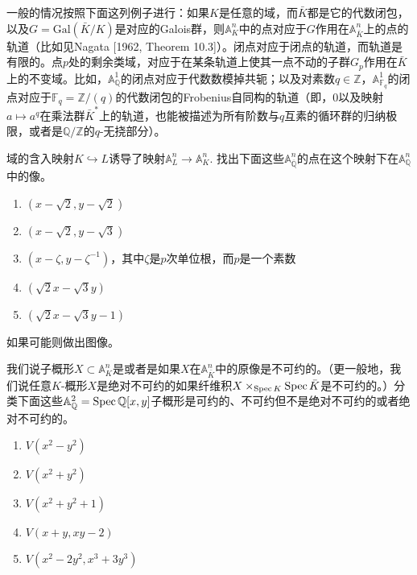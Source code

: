 一般的情况按照下面这列例子进行：如果$K$是任意的域，而$\bar K$都是它的代数闭包，以及$G=\mathrm{Gal}(\bar K/K)$是对应的Galois群，则$\mathbb{A}_{K}^n$中的点对应于$G$作用在$\mathbb{A}_{\bar K}^n$上的点的轨道（比如见Nagata [1962, Theorem 10.3]）。闭点对应于闭点的轨道，而轨道是有限的。点$p$处的剩余类域，对应于在某条轨道上使其一点不动的子群$G_p$作用在$\bar K$上的不变域。比如，$\mathbb{A}^1_\mathbb{Q}$的闭点对应于代数数模掉共轭；以及对素数$q\in \mathbb{Z}$，$\mathbb{A}_{\mathbb{F}_q}^1$的闭点对应于$\mathbb{F}_q=\mathbb{Z}/(q)$的代数闭包的Frobenius自同构的轨道（即，$0$以及映射$a\mapsto a^q$在乘法群$\bar K^*$上的轨道，也能被描述为所有阶数与$q$互素的循环群的归纳极限，或者是$\mathbb{Q}/\mathbb{Z}$的$q$-无挠部分）。

\begin{exe}
	域的含入映射$K\hookrightarrow L$诱导了映射$\mathbb{A}_L^n\to \mathbb{A}_K^n$. 找出下面这些$\mathbb{A}_{\overline{\mathbb{Q}}}^n$的点在这个映射下在$\mathbb{A}_{\mathbb{Q}}^n$中的像。

	\begin{enumerate}[{(a)}]\setlength{\itemsep}{0pt}
		\item $(x-\sqrt{2},y-\sqrt{2})$
		\item $(x-\sqrt{2},y-\sqrt{3})$
		\item $(x-\zeta,y-\zeta^{-1})$，其中$\zeta$是$p$次单位根，而$p$是一个素数
		\item $(\sqrt{2}x-\sqrt{3}y)$
		\item $(\sqrt{2}x-\sqrt{3}y-1)$
	\end{enumerate}
	如果可能则做出图像。
\end{exe}

\begin{exe}
	我们说子概形$X\subset \mathbb{A}_K^n$是或者是如果$X$在$\mathbb{A}_{\bar K}^n$中的原像是不可约的。（更一般地，我们说任意$K$-概形$X$是绝对不可约的如果纤维积$X\times_{\operatorname{Spec} K}\operatorname{Spec} \bar{K}$是不可约的。）分类下面这些$\mathbb{A}_\mathbb{Q}^2=\operatorname{Spec} \mathbb{Q}[x,y]$子概形是可约的、不可约但不是绝对不可约的或者绝对不可约的。

	\begin{enumerate}[{(a)}]\setlength{\itemsep}{0pt}
		\item $V(x^2-y^2)$
		\item $V(x^2+y^2)$
		\item $V(x^2+y^2+1)$
		\item $V(x+y,xy-2)$
		\item $V(x^2-2y^2,x^3+3y^3)$
	\end{enumerate}
\end{exe}

